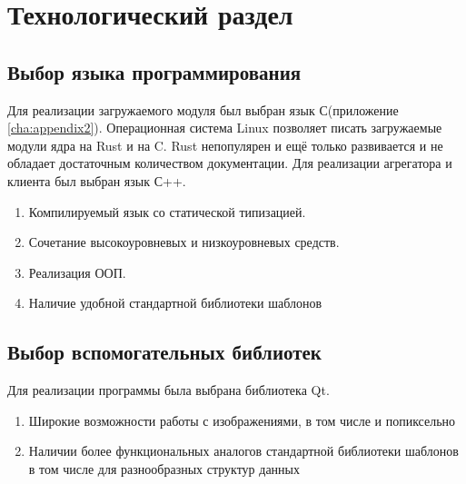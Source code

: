 \chapter{Технологический раздел}
\section{Выбор  языка программирования}
Для реализации загружаемого модуля был выбран язык С(приложение \ref{cha:appendix2}). 
Операционная система Linux позволяет писать загружаемые модули ядра на Rust и на C. 
Rust непопулярен и ещё только развивается и не обладает достаточным количеством документации.
Для реализации агрегатора и клиента был выбран язык С++.
\begin{enumerate}
	 \item Компилируемый язык со статической типизацией. 
	 \item Сочетание высокоуровневых и низкоуровневых средств.
	 \item Реализация ООП.
	 \item Наличие удобной стандартной библиотеки шаблонов
	 \end{enumerate}
\section{Выбор вспомогательных библиотек}
Для реализации программы была выбрана библиотека Qt.
\begin{enumerate}
	\item Широкие возможности работы с изображениями, в том числе и попиксельно
	\item Наличии более функциональных аналогов стандартной библиотеки шаблонов в том числе для разнообразных структур данных
\end{enumerate}




